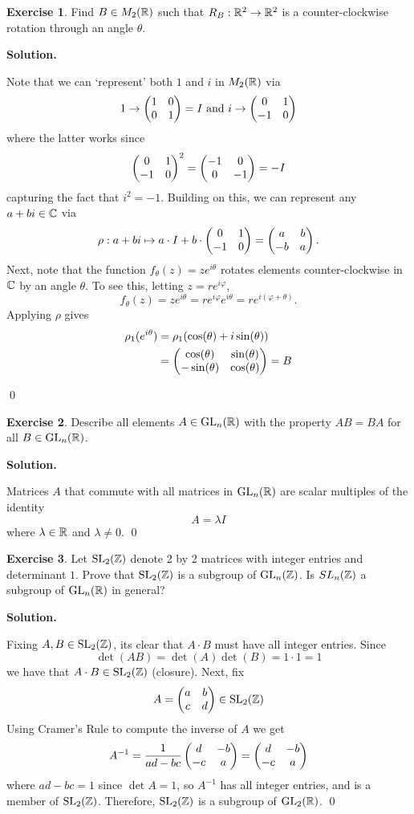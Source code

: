 \documentclass[12pt]{book}
\theoremstyle{definition}
\newtheorem{exercise}{Exercise}[chapter]
\newenvironment{solution}
{%
  \par\noindent\textbf{Solution.}\quad
}
{%
  \qed\par
}
\begin{document}
\begin{exercise}
  Find $B \in M_2(\mathbb{R})$ such that $R_B : \mathbb{R}^2 \to \mathbb{R}^2$ is a counter-clockwise rotation through an angle $\theta$.
\end{exercise}

\begin{solution}
  Note that we can `represent' both $1$ and $i$ in $M_2(\mathbb{R})$ via
  \[
  1 \to \begin{pmatrix} 1 & 0 \\ 0 & 1 \end{pmatrix} = I \text{ and } i \to \begin{pmatrix} 0 & 1 \\ -1 & 0 \end{pmatrix}
  \]
  where the latter works since
  \[
    \begin{pmatrix} 0 & 1 \\ -1 & 0 \end{pmatrix}^2 = \begin{pmatrix} -1 & 0 \\ 0 & -1 \end{pmatrix} = -I
  \]
  capturing the fact that $i^2 = -1$. 
  Building on this, we can represent any $a+bi \in \mathbb{C}$ via 
  \[
    \rho : a+bi\mapsto a \cdot I + b \cdot \begin{pmatrix} 0 & 1 \\ -1 & 0 \end{pmatrix} = \begin{pmatrix} a & b \\ -b & a \end{pmatrix}.
  \]
  Next, note that the function $f_\theta(z) = ze^{i\theta}$ rotates elements counter-clockwise in $\mathbb{C}$ by an angle $\theta$. 
  To see this, letting $z=re^{i\varphi}$,
  \[f_\theta(z) = ze^{i\theta} = re^{i\varphi}e^{i\theta} = re^{i(\varphi + \theta)}.\]
  Applying $\rho$ gives
  \[
  \begin{aligned}
    \rho_1(e^{i\theta}) &= \rho_1(\cos(\theta) + i\sin(\theta)) \\
                        &= \begin{pmatrix} \cos(\theta) & \sin(\theta) \\ -\sin(\theta) & \cos(\theta) \end{pmatrix} = B
  \end{aligned}
  \]


\end{solution}

\begin{exercise}
  Describe all elements $A \in \mathrm{GL}_{n}(\mathbb{R})$ with the property $AB=BA$ for all $B \in \mathrm{GL}_{n}(\mathbb{R})$.
\end{exercise}

\begin{solution}
  Matrices $A$ that commute with all matrices in $\mathrm{GL}_{n}(\mathbb{R})$ are scalar multiples of the identity
  \[
  A = \lambda I
  \]
  where $\lambda \in \mathbb{R}$ and $\lambda \neq 0$.
\end{solution}

\begin{exercise}
  Let $\mathrm{SL}_{2}(\mathbb{Z})$ denote 2 by 2 matrices with integer entries and determinant $1$.
  Prove that $\mathrm{SL}_{2}(\mathbb{Z})$ is a subgroup of $\mathrm{GL}_{n}(\mathbb{Z})$. 
  Is $SL_n(\mathbb{Z})$ a subgroup of $\mathrm{GL}_{n}(\mathbb{R})$ in general?
\end{exercise}

\begin{solution}
  Fixing $A, B \in \mathrm{SL}_{2}(\mathbb{Z})$, its clear that $A \cdot B$ must have all integer entries.
  Since
  \[
  \det(AB) = \det(A) \det(B) = 1 \cdot 1 = 1
  \]
  we have that $A \cdot B \in \mathrm{SL}_{2}(\mathbb{Z})$ (closure). 
  Next, fix
  \[
    A = \begin{pmatrix} a & b \\ c & d \end{pmatrix} \in \mathrm{SL}_{2}(\mathbb{Z})
  \]
  Using Cramer's Rule to compute the inverse of $A$ we get 
  \[
  A^{-1} = \frac{1}{ad-bc}\begin{pmatrix} d & -b \\ -c & a \end{pmatrix} = \begin{pmatrix} d & -b \\ -c & a \end{pmatrix} 
  \]
  where $ad-bc = 1$ since $\det A = 1$, so $A^{-1}$ has all integer entries, and is a member of $\mathrm{SL}_{2}(\mathbb{Z})$.
  Therefore, $\mathrm{SL}_{2}(\mathbb{Z})$ is a subgroup of $\mathrm{GL}_{2}(\mathbb{R})$.
\end{solution}
\end{document}
